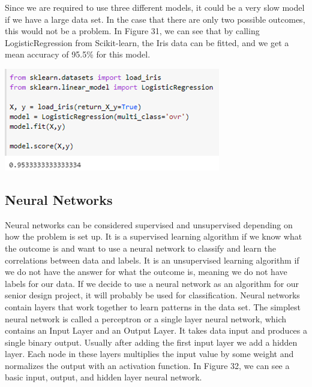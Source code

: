 \documentclass[a4paper,12pt]{report}
\begin{document}
Since we are required to use three different models, it could be a very slow model if we have a large data set. In the case that there are only two possible outcomes, this would not be a problem. In Figure 31, we can see that by calling LogisticRegression from Scikit-learn, the Iris data can be fitted, and we get a mean accuracy of 95.5\% for this model.

\begin{center}
    \captionsetup{type=figure}
    \includegraphics[width=.9\linewidth]{media/sklearnRegression.png}
\end{center}

\subsection{Neural Networks}

Neural networks can be considered supervised and unsupervised depending on how the problem is set up. It is a supervised learning algorithm if we know what the outcome is and want to use a neural network to classify and learn the correlations between data and labels. It is an unsupervised learning algorithm if we do not have the answer for what the outcome is, meaning we do not have labels for our data. If we decide to use a neural network as an algorithm for our senior design project, it will probably be used for classification. Neural networks contain layers that work together to learn patterns in the data set. The simplest neural network is called a perceptron or a single layer neural network, which contains an Input Layer and an Output Layer. It takes data input and produces a single binary output. Usually after adding the first input layer we add a hidden layer. Each node in these layers multiplies the input value by some weight and normalizes the output with an activation function. In Figure 32, we can see a basic input, output, and hidden layer neural network. 
\end{document}
